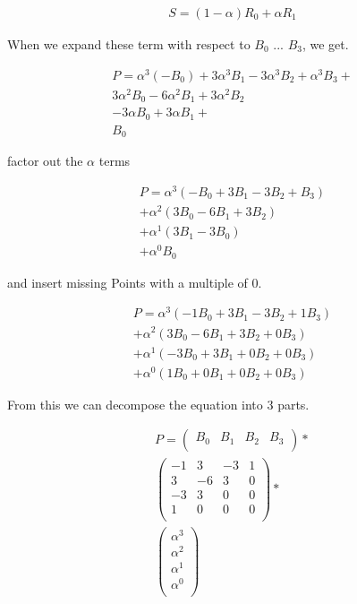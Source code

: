 \begin{align*}
    S=(1-\alpha ) R_0+\alpha  R_1
\end{align*}

When we expand these term with respect to $B_0$ ... $B_3$, we get.

\begin{align*}
    P=\alpha ^3 \left(-B_0\right)+3 \alpha ^3 B_1-3 \alpha ^3 B_2+\alpha ^3 B_3+\\
    3 \alpha ^2 B_0-6 \alpha ^2 B_1+3 \alpha ^2 B_2\\
    -3 \alpha  B_0+3 \alpha  B_1+\\
    B_0
\end{align*}

factor out the $\alpha$ terms

\begin{align*}
    P=\alpha ^3 \left(-B_0+3 B_1-3 B_2+B_3\right)\\
    +\alpha ^2 \left(3 B_0-6 B_1+3 B_2\right)\\
    +\alpha ^1 \left(3 B_1-3 B_0\right)\\
    +\alpha ^0 B_0
\end{align*}

and insert missing Points with a multiple of 0.

\begin{align*}
    P=\alpha ^3 \left(-1 B_0+3 B_1-3 B_2+1 B_3\right)  \\
    +\alpha ^2 \left( 3 B_0-6 B_1+3 B_2+0 B_3\right) \\
    +\alpha ^1 \left(-3 B_0+3 B_1+0 B_2+0 B_3\right) \\
    +\alpha ^0 \left( 1 B_0+0 B_1+0 B_2+0 B_3\right)
\end{align*}

From this we can decompose the equation into 3 parts.

\begin{align}
    P=\left(
    \begin{array}{cccc}
        B_0 & B_1 & B_2 & B_3 \\
    \end{array}
    \right)
    *\\
    \left(
    \begin{array}{cccc}
        -1 & 3  & -3 & 1 \\
        3  & -6 & 3  & 0 \\
        -3 & 3  & 0  & 0 \\
        1  & 0  & 0  & 0 \\
    \end{array}
    \right)
    *\\
    \left(
    \begin{array}{cccc}
        \alpha ^3 \\
        \alpha ^2 \\
        \alpha ^1 \\
        \alpha ^0 \\
    \end{array}
    \right)
\end{align}

